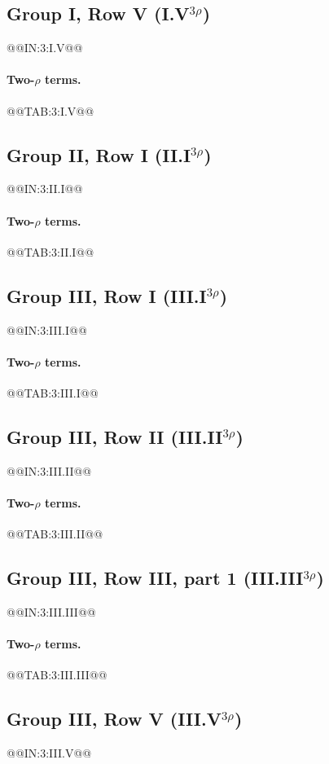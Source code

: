 \documentclass[10pt]{article}
\numberwithin{equation}{section}
\begin{document}
\subsection{Group I, Row V \texorpdfstring{(I.V$^{3\rho}$)}{}}\label{src:3:I.V}
@@IN:3:I.V@@
\paragraph{Two-$\rho$ terms.}
@@TAB:3:I.V@@

\subsection{Group II, Row I \texorpdfstring{(II.I$^{3\rho}$)}{}}\label{src:3:II.I}
@@IN:3:II.I@@
\paragraph{Two-$\rho$ terms.}
@@TAB:3:II.I@@

\subsection{Group III, Row I \texorpdfstring{(III.I$^{3\rho}$)}{}}\label{src:3:III.I}
@@IN:3:III.I@@
\paragraph{Two-$\rho$ terms.}
@@TAB:3:III.I@@

\subsection{Group III, Row II \texorpdfstring{(III.II$^{3\rho}$)}{}}\label{src:3:III.II}
@@IN:3:III.II@@
\paragraph{Two-$\rho$ terms.}
@@TAB:3:III.II@@

\subsection{Group III, Row III, part 1 \texorpdfstring{(III.III$^{3\rho}$)}{}}\label{src:3:III.III}
@@IN:3:III.III@@
\paragraph{Two-$\rho$ terms.}
@@TAB:3:III.III@@

\subsection{Group III, Row V \texorpdfstring{(III.V$^{3\rho}$)}{}}\label{src:3:III.V}
@@IN:3:III.V@@
\end{document}
